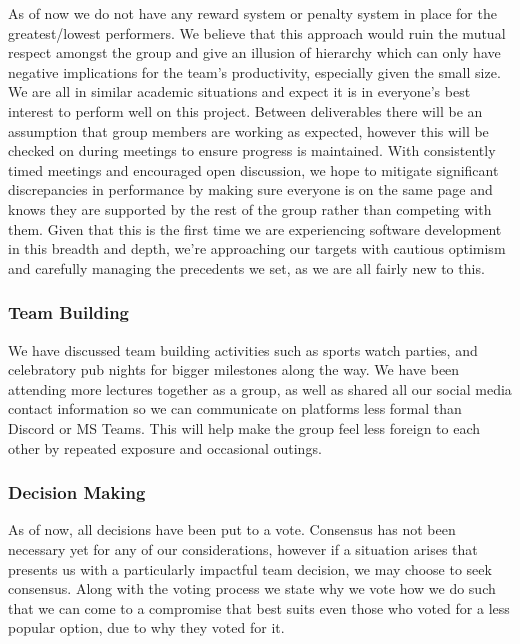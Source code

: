 \documentclass{article}
\begin{document}
As of now we do not have any reward system or penalty system in place for the greatest/lowest performers. We believe that this approach would ruin the mutual respect amongst the group and give an illusion of hierarchy which can only have negative implications for the team's productivity, especially given the small size. We are all in similar academic situations and expect it is in everyone's best interest to perform well on this project. Between deliverables there will be an assumption that group members are working as expected, however this will be checked on during meetings to ensure progress is maintained. With consistently timed meetings and encouraged open discussion, we hope to mitigate significant discrepancies in performance by making sure everyone is on the same page and knows they are supported by the rest of the group rather than competing with them. Given that this is the first time we are experiencing software development in this breadth and depth, we're approaching our targets with cautious optimism and carefully managing the precedents we set, as we are all fairly new to this.

\subsubsection*{Team Building}

We have discussed team building activities such as sports watch parties, and celebratory pub nights for bigger milestones along the way. We have been attending more lectures together as a group, as well as shared all our social media contact information so we can communicate on platforms less formal than Discord or MS Teams. This will help make the group feel less foreign to each other by repeated exposure and occasional outings.

\subsubsection*{Decision Making} 

As of now, all decisions have been put to a vote. Consensus has not been necessary yet for any of our considerations, however if a situation arises that presents us with a particularly impactful team decision, we may choose to seek consensus. Along with the voting process we state why we vote how we do such that we can come to a compromise that best suits even those who voted for a less popular option, due to why they voted for it.
\end{document}
